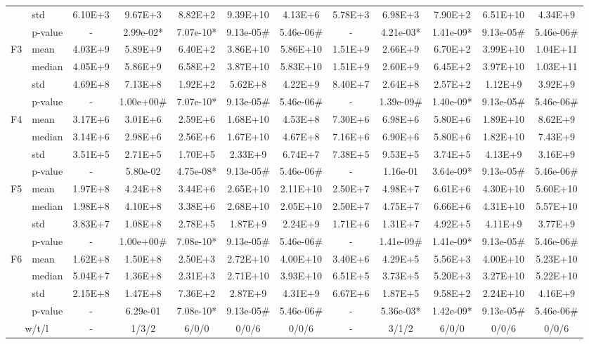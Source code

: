 \documentclass[conference]{IEEEtran}
\begin{document}
\begin{table}[htbp]
{\begin{tabular}{llccccc|ccccc}
& std     & 6.10E+3 & 9.67E+3 & 8.82E+2 & 9.39E+10 & 4.13E+6 & 5.78E+3 & 6.98E+3 & 7.90E+2 & 6.51E+10 & 4.34E+9 \\
& p-value & - & 2.99e-02* & 7.07e-10* & 9.13e-05\# & 5.46e-06\# & - & 4.21e-03* & 1.41e-09* & 9.13e-05\# & 5.46e-06\# \\
\midrule
\multirow{4}{*}{F3}
& mean    & 4.03E+9 & 5.89E+9 & 6.40E+2 & 3.86E+10 & 5.86E+10 & 1.51E+9 & 2.66E+9 & 6.70E+2 & 3.99E+10 & 1.04E+11 \\
& median  & 4.05E+9 & 5.86E+9 & 6.58E+2 & 3.87E+10 & 5.83E+10 & 1.51E+9 & 2.60E+9 & 6.45E+2 & 3.97E+10 & 1.03E+11 \\
& std     & 4.69E+8 & 7.13E+8 & 1.92E+2 & 5.62E+8 & 4.22E+9 & 8.40E+7 & 2.64E+8 & 2.57E+2 & 1.12E+9 & 3.92E+9 \\
& p-value & - & 1.00e+00\# & 7.07e-10* & 9.13e-05\# & 5.46e-06\# & - & 1.39e-09\# & 1.40e-09* & 9.13e-05\# & 5.46e-06\# \\
\midrule
\multirow{4}{*}{F4}
& mean    & 3.17E+6 & 3.01E+6 & 2.59E+6 & 1.68E+10 & 4.53E+8 & 7.30E+6 & 6.98E+6 & 5.80E+6 & 1.89E+10 & 8.62E+9 \\
& median  & 3.14E+6 & 2.98E+6 & 2.56E+6 & 1.67E+10 & 4.67E+8 & 7.16E+6 & 6.90E+6 & 5.80E+6 & 1.82E+10 & 7.43E+9 \\
& std     & 3.51E+5 & 2.71E+5 & 1.70E+5 & 2.33E+9 & 6.74E+7 & 7.38E+5 & 9.53E+5 & 3.74E+5 & 4.13E+9 & 3.16E+9 \\
& p-value & - & 5.80e-02 & 4.75e-08* & 9.13e-05\# & 5.46e-06\# & - & 1.16e-01 & 3.64e-09* & 9.13e-05\# & 5.46e-06\# \\
\midrule
\multirow{4}{*}{F5}
& mean    & 1.97E+8 & 4.24E+8 & 3.44E+6 & 2.65E+10 & 2.11E+10 & 2.50E+7 & 4.98E+7 & 6.61E+6 & 4.30E+10 & 5.60E+10 \\
& median  & 1.98E+8 & 4.10E+8 & 3.38E+6 & 2.68E+10 & 2.05E+10 & 2.50E+7 & 4.75E+7 & 6.66E+6 & 4.31E+10 & 5.57E+10 \\
& std     & 3.83E+7 & 1.08E+8 & 2.78E+5 & 1.87E+9 & 2.24E+9 & 1.71E+6 & 1.31E+7 & 4.92E+5 & 4.11E+9 & 3.77E+9 \\
& p-value & - & 1.00e+00\# & 7.08e-10* & 9.13e-05\# & 5.46e-06\# & - & 1.41e-09\# & 1.41e-09* & 9.13e-05\# & 5.46e-06\# \\
\midrule
\multirow{4}{*}{F6}
& mean    & 1.62E+8 & 1.50E+8 & 2.50E+3 & 2.72E+10 & 4.00E+10 & 3.40E+6 & 4.29E+5 & 5.56E+3 & 4.00E+10 & 5.23E+10 \\
& median  & 5.04E+7 & 1.36E+8 & 2.31E+3 & 2.71E+10 & 3.93E+10 & 6.51E+5 & 3.73E+5 & 5.20E+3 & 3.27E+10 & 5.22E+10 \\
& std     & 2.15E+8 & 1.47E+8 & 7.36E+2 & 2.87E+9 & 4.31E+9 & 6.67E+6 & 1.87E+5 & 9.58E+2 & 2.24E+10 & 4.16E+9 \\
& p-value & - & 6.29e-01 & 7.08e-10* & 9.13e-05\# & 5.46e-06\# & - & 5.36e-03* & 1.42e-09* & 9.13e-05\# & 5.46e-06\# \\
\midrule
\multicolumn{2}{c}{w/t/l} & - & 1/3/2 & 6/0/0 & 0/0/6 & 0/0/6 & - & 3/1/2 & 6/0/0 & 0/0/6 & 0/0/6 \\
\bottomrule
\end{tabular}
}
\end{table}
\end{document}
